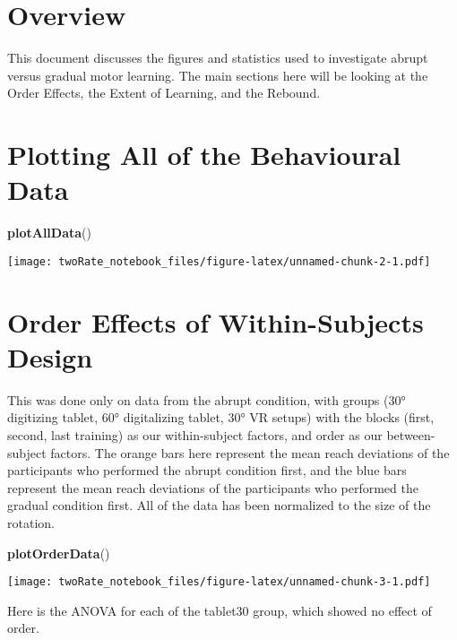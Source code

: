 \documentclass[]{article}
\newenvironment{Shaded}{\begin{snugshade}}{\end{snugshade}}
\newcommand{\KeywordTok}[1]{\textcolor[rgb]{0.13,0.29,0.53}{\textbf{#1}}}
\newcommand{\NormalTok}[1]{#1}
\begin{document}
\section{Overview}\label{overview}

This document discusses the figures and statistics used to investigate
abrupt versus gradual motor learning. The main sections here will be
looking at the Order Effects, the Extent of Learning, and the Rebound.

\section{Plotting All of the Behavioural
Data}\label{plotting-all-of-the-behavioural-data}

\begin{Shaded}
\begin{Highlighting}[]
\KeywordTok{plotAllData}\NormalTok{()}
\end{Highlighting}
\end{Shaded}

\texttt{[image: twoRate\_notebook\_files/figure-latex/unnamed-chunk-2-1.pdf]}

\section{Order Effects of Within-Subjects
Design}\label{order-effects-of-within-subjects-design}

This was done only on data from the abrupt condition, with groups (30°
digitizing tablet, 60° digitalizing tablet, 30° VR setups) with the
blocks (first, second, last training) as our within-subject factors, and
order as our between-subject factors. The orange bars here represent the
mean reach deviations of the participants who performed the abrupt
condition first, and the blue bars represent the mean reach deviations
of the participants who performed the gradual condition first. All of
the data has been normalized to the size of the rotation.

\begin{Shaded}
\begin{Highlighting}[]
\KeywordTok{plotOrderData}\NormalTok{()}
\end{Highlighting}
\end{Shaded}

\texttt{[image: twoRate\_notebook\_files/figure-latex/unnamed-chunk-3-1.pdf]}

Here is the ANOVA for each of the tablet30 group, which showed no effect
of order.
\end{document}
